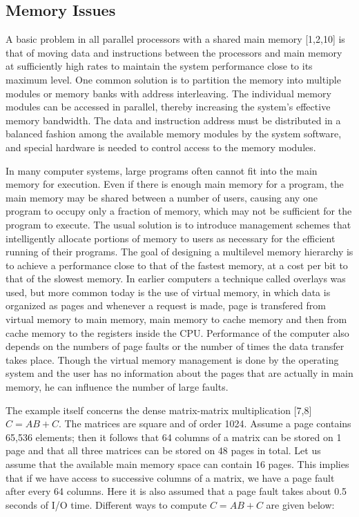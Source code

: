 \subsection{Memory Issues}
A basic problem in all parallel processors with a shared main memory [1,2,10] is that of moving data and instructions between the processors and main memory at
sufficiently high rates to maintain the system performance close to its maximum level. One common solution is to partition the memory into multiple modules or
memory banks with address interleaving. The individual memory modules can be accessed in parallel, thereby increasing the system's effective memory bandwidth.
The data and instruction address must be distributed in a balanced fashion among the available memory modules by the system software, and special hardware is
needed to control access to the memory modules. \par
\hspace{1in} In many computer systems, large programs often cannot fit into the main memory for execution. Even if there is enough main memory for a program,
the main memory may be shared between a number of users, causing any one program to occupy only a fraction of memory, which may not be sufficient for the
program to execute. The usual solution is to introduce management schemes that intelligently allocate portions of memory to users as necessary for the
efficient running of their programs. The goal of designing a multilevel memory hierarchy is to achieve a performance close to that of the fastest memory, at a
cost per bit to that of the slowest memory. In earlier computers a technique called overlays was used, but more common today is the use of virtual memory,
in which data is organized as pages and whenever a request is made, page is transfered from virtual memory to main memory, main memory to cache memory and then
from cache memory to the registers inside the CPU. Performance of the computer also depends on the numbers of page faults or the number of times the data
transfer takes place. Though the virtual memory management is done by the operating system and the user has no information about the pages that are
actually in main memory, he can influence the number of large faults. \par
\hspace{1in} The example itself concerns the dense matrix-matrix multiplication [7,8] $C = AB + C$. The matrices are square and of order 1024. Assume a page
contains 65,536 elements; then it follows that 64 columns of a matrix can be stored on 1 page and that all three matrices can be stored on 48 pages in total.
Let us assume that the available main memory space can contain 16 pages. This implies that if we have access to successive columns of a matrix, we have a page
fault after every 64 columns. Here it is also assumed that a page fault takes about 0.5 seconds of I/O time. Different ways to compute $C = AB + C$ are given
below:

